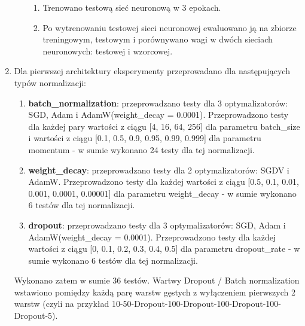 \documentclass[12pt]{article}
\begin{document}
\begin{enumerate}
\begin{enumerate}
\begin{enumerate}
			\item Trenowano testową sieć neuronową w 3 epokach.
			\item Po wytrenowaniu testowej sieci neuronowej ewaluowano ją na zbiorze treningowym, testowym i porównywano wagi w dwóch sieciach neuronowych: testowej i wzorcowej.
		\end{enumerate}
	\end{enumerate}
	\item Dla pierwszej architektury eksperymenty przeprowadano dla następujących typów normalizacji:
	\begin{enumerate}
		\item \textbf{batch\_normalization}: przeprowadzano testy dla 3 optymalizatorów: SGD, Adam i AdamW(weight\_decay = 0.0001). Przeprowadzono testy dla każdej pary wartości z ciągu [4, 16, 64, 256] dla parametru batch\_size i wartości z ciągu [0.1, 0.5, 0.9, 0.95, 0.99, 0.999] dla parametru momentum - w sumie wykonano 24 testy dla tej normalizacji.
		
		\item \textbf{weight\_decay}: przeprowadzano testy dla 2 optymalizatorów: SGDV i AdamW. Przeprowadzono testy dla każdej wartości z ciągu [0.5, 0.1, 0.01, 0.001, 0.0001, 0.00001] dla parametru weight\_decay - w sumie wykonano 6 testów dla tej normalizacji.
		
		\item \textbf{dropout}: przeprowadzano testy dla 3 optymalizatorów: SGD, Adam i AdamW(weight\_decay = 0.0001). Przeprowadzono testy dla każdej wartości z ciągu [0, 0.1, 0.2, 0.3, 0.4, 0.5] dla parametru dropout\_rate - w sumie wykonano 6 testów dla tej normalizacji.
	\end{enumerate}
	Wykonano zatem w sumie 36 testów. Wartwy Dropout / Batch normalization wstawiono pomiędzy każdą parę warstw gęstych z wyłączeniem pierwszych 2 warstw (czyli na przykład 10-50-Dropout-100-Dropout-100-Dropout-100-Dropout-5).
	

\end{enumerate}
\end{document}
